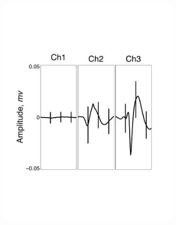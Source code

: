 \begin{center}
\begin{figure}
\begin{subfigure}[b]{.28\textwidth}
\includegraphics[width=\textwidth]{../figs/3devim/clus1}
\caption{}
\label{ex31}
\end{subfigure}
\begin{subfigure}[b]{.28\textwidth}

\end{subfigure}
\end{figure}
\end{center}
